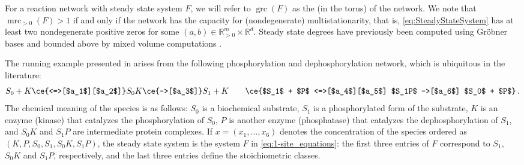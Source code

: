 \documentclass[11pt,reqno,a4paper]{amsart}
\numberwithin{equation}{section}
\theoremstyle{theoremstyle}
\theoremstyle{examplestyle}
\newcommand{\RR}{\mathbb{R}}
\DeclareMathOperator{\grc}{grc}
\DeclareMathOperator{\mrc}{mrc}
\newcommand{\term}{\bfemph}
\begin{document}
For a reaction network with steady state system $F$, we will refer to $\grc(F)$ as the \term{steady state degree} (in the torus) of the network. We note that $\mrc_{>0}(F)>1$ if and only if the network has the capacity for (nondegenerate) multistationarity, that is,  \eqref{eq:SteadyStateSystem} has at least two nondegenerate positive zeros for some $(a,b)\in\RR^m_{>0}\times\RR^d$. Steady state degrees have previously been computed using Gröbner bases \cite{Gross2016wnt} and bounded above by mixed volume computations \cite{GrossHill2021}.
 
The running example presented in  arises from the following phosphorylation and dephosphorylation network, which is ubiquitous in the literature:
\begin{equation}
\label{eq:1-site_network}
S_0 + K \ce{<=>[$a_1$][$a_2$]} S_0K \ce{->[$a_3$]} S_1 + K  \qquad 
    \ce{$S_1$ + $P$ <=>[$a_4$][$a_5$] $S_1P$ ->[$a_6$] $S_0$ + $P$}\,.
\end{equation}
The chemical meaning of the species is as follows: $S_0$ is a biochemical substrate, $S_1$ is a phosphorylated form of the substrate, $K$ is an enzyme (kinase) that catalyzes the phosphorylation of $S_0$, $P$ is another enzyme (phosphatase) that catalyzes the dephosphorylation of $S_1$, and $S_0K$ and $S_1P$ are intermediate protein complexes. If $x=(x_1,\ldots,x_6)$ denotes the concentration of the species ordered as $(K,P,S_0,S_1,S_0K,S_1P)$, the steady state system is the system $F$ in \eqref{eq:1-site_equations}: the first three entries of $F$ correspond to $S_1$, $S_0K$ and $S_1P$, respectively, and the last three entries define the stoichiometric classes. 
\end{document}
